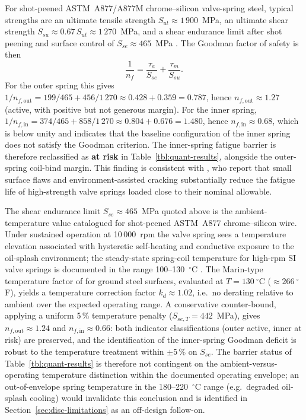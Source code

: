 For shot-peened ASTM~A877/A877M chrome--silicon valve-spring steel,
typical strengths are an ultimate tensile strength
$S_{ut}\approx 1\,900$~MPa, an ultimate shear strength
$S_{su}\approx 0.67\,S_{ut}\approx 1\,270$~MPa, and a shear endurance
limit after shot peening and surface control of
$S_{se}\approx 465$~MPa
\citep[\S~10-30]{shigley2020}. The Goodman factor of safety is then
\begin{equation}
\frac{1}{n_{f}}=\frac{\tau_{a}}{S_{se}}+\frac{\tau_{m}}{S_{su}}.
\label{eq:goodman}
\end{equation}
For the outer spring this gives
$1/n_{f,\mathrm{out}}=199/465+456/1\,270\approx 0.428+0.359=0.787$,
hence $n_{f,\mathrm{out}}\approx 1.27$ (active, with positive but
not generous margin). For the inner spring,
$1/n_{f,\mathrm{in}}=374/465+858/1\,270\approx 0.804+0.676=1.480$,
hence $n_{f,\mathrm{in}}\approx 0.68$, which is below unity and
indicates that the baseline configuration of the inner spring does
not satisfy the Goodman criterion. The inner-spring fatigue barrier
is therefore reclassified as \textbf{at risk} in
Table~\ref{tbl:quant-results}, alongside the outer-spring coil-bind
margin. This finding is consistent with
\citet{xing2021valvespringEAC,ko2022springfatigueflaws}, who report
that small surface flaws and environment-assisted cracking
substantially reduce the fatigue life of high-strength valve springs
loaded close to their nominal allowable.

The shear endurance limit $S_{se}\approx 465$~MPa quoted above is the
ambient-temperature value catalogued for shot-peened ASTM~A877
chrome--silicon wire. Under sustained operation at 10\,000~rpm the
valve spring sees a temperature elevation associated with hysteretic
self-heating and conductive exposure to the oil-splash environment;
the steady-state spring-coil temperature for high-rpm SI valve
springs is documented in the range 100--130~$^{\circ}$C
\citep{heisler2002}. The Marin-type temperature factor of
\citet[Eq.~7-19]{shigley2020} for ground steel surfaces, evaluated at
$T=130~^{\circ}$C ($\approx 266~^{\circ}$F), yields a temperature
correction factor $k_{d}\approx 1.02$, i.e.\ no derating relative to
ambient over the expected operating range. A conservative
counter-bound, applying a uniform 5\,\% temperature penalty
($S_{se,T}=442$~MPa), gives $n_{f,\mathrm{out}}\approx 1.24$ and
$n_{f,\mathrm{in}}\approx 0.66$: both indicator
classifications (outer active, inner at risk) are preserved, and the
identification of the inner-spring Goodman deficit is robust to the
temperature treatment within $\pm$5\,\% on $S_{se}$. The barrier
status of Table~\ref{tbl:quant-results} is therefore not contingent
on the ambient-versus-operating temperature distinction within the
documented operating envelope; an out-of-envelope spring temperature
in the 180--220~$^{\circ}$C range (e.g.\ degraded oil-splash cooling)
would invalidate this conclusion and is identified in
Section~\ref{sec:disc-limitations} as an off-design follow-on.

